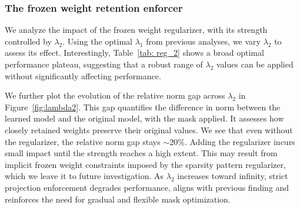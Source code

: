 \subsubsection{The frozen weight retention enforcer}
\label{frozen}
We analyze the impact of the frozen weight regularizer, with its strength controlled by $\lambda_{2}$. Using the optimal $\lambda_{1}$ from previous analyses, we vary $\lambda_{2}$ to assess its effect. Interestingly, Table~\ref{tab: reg_2} shows a broad optimal performance plateau, suggesting that a robust range of $\lambda_{2}$ values can be applied without significantly affecting performance.

We further plot the evolution of the relative norm gap across $\lambda_{2}$ in Figure~\ref{fig:lambda2}. 
This gap quantifies the difference in norm between the learned model and the original model, with the mask applied. It assesses how closely retained weights preserve their original values. We see that even without the regularizer, the relative norm gap stays $\sim$20\%. Adding the regularizer incurs small impact until the strength reaches a high extent.
This may result from implicit frozen weight constraints imposed by the sparsity pattern regularizer, which we leave it to future investigation. As $\lambda_{2}$ increases toward infinity, strict projection enforcement degrades performance, aligns with previous finding and reinforces the need for gradual and flexible mask optimization.





